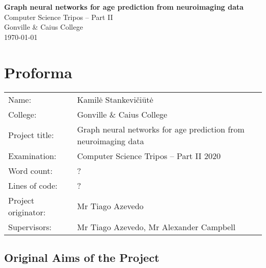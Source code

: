 \documentclass[12pt,a4paper,twoside, openright, hidelinks]{report}
\begin{document}



\pagestyle{empty}


\vspace*{60mm}
\begin{center}
\LARGE
\textbf{Graph neural networks for age prediction from neuroimaging data} \\[5mm]
\large
Computer Science Tripos -- Part II \\[5mm]
Gonville \& Caius College \\[5mm]
\today  %
\end{center}


\pagestyle{plain}

\chapter*{Proforma}

\begin{tabular}{ll}
Name:               & Kamilė Stankevičiūtė                     \\
College:            & Gonville \& Caius College                     \\
Project title:      & Graph neural networks for age prediction from neuroimaging data \\
Examination:        & Computer Science Tripos -- Part II 2020 \\
Word count:         & ? \footnotemark[1] \\
Lines of code:      & ?  \\
Project originator: & Mr Tiago Azevedo                        \\
Supervisors:        & Mr Tiago Azevedo, Mr Alexander Campbell \\ 
\end{tabular}



\section*{Original Aims of the Project}
\end{document}
